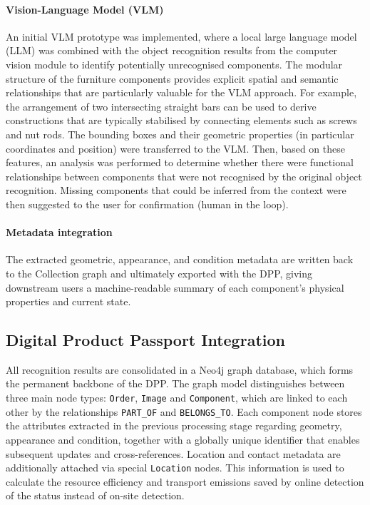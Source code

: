 \documentclass[3p,times,procedia]{elsarticle}
\begin{document}
\paragraph{Vision-Language Model (VLM)}
An initial VLM prototype was implemented, where a local large language model (LLM) was combined with the object recognition results from the computer vision module to identify potentially unrecognised components.
The modular structure of the furniture components provides explicit spatial and semantic relationships that are particularly valuable for the VLM approach. For example, the arrangement of two intersecting straight bars can be used to derive constructions that are typically stabilised by connecting elements such as screws and nut rods.
The bounding boxes and their geometric properties (in particular coordinates and position) were transferred to the VLM. 
Then, based on these features, an analysis was performed to determine whether there were functional relationships between components that were not recognised by the original object recognition. Missing components that could be inferred from the context were then suggested to the user for confirmation (human in the loop).


\paragraph{Metadata integration}
The extracted geometric, appearance, and condition metadata are written back to the Collection graph and ultimately exported with the DPP, giving downstream users a machine-readable summary of each component’s physical properties and current state.

\subsection{Digital Product Passport Integration}
\label{sec:dpp-integration}

All recognition results are consolidated in a Neo4j graph database, which forms the permanent backbone of the DPP. The graph model distinguishes between three main node types: \texttt{Order}, \texttt{Image} and \texttt{Component}, which are linked to each other by the relationships \texttt{PART\_OF} and \texttt{BELONGS\_TO}. 
Each component node stores the attributes extracted in the previous processing stage regarding geometry, appearance and condition, together with a globally unique identifier that enables subsequent updates and cross-references. 
Location and contact metadata are additionally attached via special \texttt{Location} nodes. This information is used to calculate the resource efficiency and transport emissions saved by online detection of the status instead of on-site detection.
\end{document}
